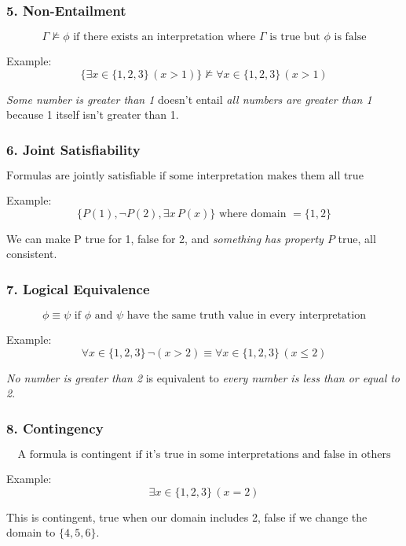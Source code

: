 \subsubsection{5. Non-Entailment}\label{non-entailment}

\[\Gamma \not\models \phi \text{ if there exists an interpretation where } \Gamma \text{ is true but } \phi \text{ is false}\]

Example:
\[\{\exists x \in \{1,2,3\} \, (x > 1)\} \not\models \forall x \in \{1,2,3\} \, (x > 1)\]

\emph{Some number is greater than 1} doesn't entail \emph{all numbers
are greater than 1} because 1 itself isn't greater than 1.

\subsubsection{6. Joint Satisfiability}\label{joint-satisfiability}

\[\text{Formulas are jointly satisfiable if some interpretation makes them all true simultaneously}\]

Example:
\[\{P(1), \neg P(2), \exists x \, P(x)\} \text{ where domain } = \{1,2\}\]

We can make P true for 1, false for 2, and \emph{something has property
\(P\)} true, all consistent.

\subsubsection{7. Logical Equivalence}\label{logical-equivalence}

\[\phi \equiv \psi \text{ if } \phi \text{ and } \psi \text{ have the same truth value in every interpretation}\]

Example:
\[\forall x \in \{1,2,3\} \, \neg(x > 2) \equiv \forall x \in \{1,2,3\} \, (x \leq 2)\]

\emph{No number is greater than 2} is equivalent to \emph{every number
is less than or equal to 2}.

\subsubsection{8. Contingency}\label{contingency}

\[\text{A formula is contingent if it's true in some interpretations and false in others}\]

Example: \[\exists x \in \{1,2,3\} \, (x = 2)\]

This is contingent, true when our domain includes 2, false if we change
the domain to \(\{4,5,6\}\).

